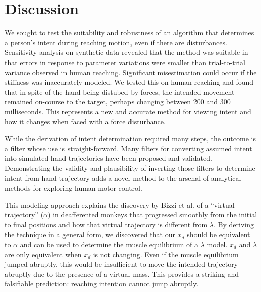 \documentclass[10pt]{article}
\begin{document}
\section*{Discussion}
We sought to test the suitability and robustness of an algorithm that determines a person's intent during reaching motion, even if there are disturbances. Sensitivity analysis on synthetic data revealed that the method was suitable in that errors in response to parameter variations were smaller than trial-to-trial variance observed in human reaching. Significant misestimation could occur if the stiffness was inaccurately modeled. We tested this on human reaching and found that in spite of the hand being distubed by forces, the intended movement remained on-course to the target, perhaps changing between 200 and 300 milliseconds. This represents a new and accurate method for viewing intent and how it changes when faced with a force disturbance.

While the derivation of intent determination required many steps, the outcome is a filter whose use is straight-forward. Many filters for converting assumed intent into simulated hand trajectories have been proposed and validated. Demonstrating the validity and plausibility of inverting those filters to determine intent from hand trajectory adds a novel method to the arsenal of analytical methods for exploring human motor control.

This modeling approach explains the discovery by Bizzi et al. \cite{bizzi1984posture} of a ``virtual trajectory'' ($\alpha$) in deafferented monkeys that progressed smoothly from the initial to final positions and how that virtual trajectory is different from $\lambda$. By deriving the technique in a general form, we discovered that our $x_d$ should be equivalent to $\alpha$ and can be used to determine the muscle equilibrium of a $\lambda$ model. $x_d$ and $\lambda$ are only equivalent when $x_d$ is not changing.  Even if the muscle equilibrium jumped abruptly, this would be insufficient to move the intended trajectory abruptly due to the presence of a virtual mass. This provides a striking and falsifiable prediction: reaching intention cannot jump abruptly.
\end{document}
